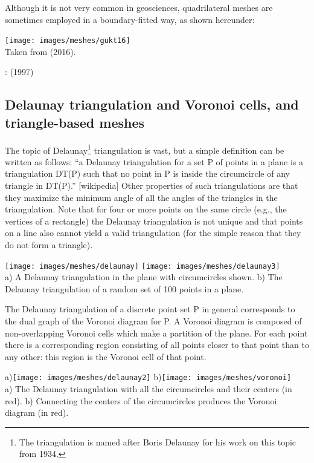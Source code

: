 Although it is not very common in geosciences, quadrilateral meshes are sometimes 
employed in a boundary-fitted way, as shown hereunder:

\begin{center}
\texttt{[image: images/meshes/gukt16]}\\
{\captionfont Taken from \textcite{gukt16} (2016).}
\end{center}

\Literature: \textcite{jole97} (1997)

\subsection{Delaunay triangulation and Voronoi cells, and triangle-based meshes} \label{ss:delaunay}

The topic of Delaunay\footnote{The triangulation is named after 
Boris Delaunay for his work on this topic from 1934.}
triangulation is vast, but a simple definition can be written 
as follows:
``a Delaunay triangulation for a set P 
of points in a plane is a triangulation DT(P) such that no point in P is  
inside the circumcircle of any triangle in DT(P).'' [wikipedia]
Other properties of such triangulations are that they 
maximize the minimum angle of all the angles of the 
triangles in the triangulation.
Note that for four or more points on the same circle (e.g., the 
vertices of a rectangle) the Delaunay triangulation is  
not unique and that points on a line also cannot yield a valid triangulation
(for the simple reason that they do not form a triangle).

\begin{center}
\texttt{[image: images/meshes/delaunay]}
\texttt{[image: images/meshes/delaunay3]}\\
{\captionfont a) A Delaunay triangulation in the plane with circumcircles shown.
b) The Delaunay triangulation of a random set of 100 points in a plane.}
\end{center}

The Delaunay triangulation of a discrete point set P in general corresponds 
to the dual graph of the Voronoi diagram for P. 
A Voronoi diagram is composed of non-overlapping Voronoi cells which make a partition 
of the plane. 
For each point there is a corresponding region consisting of all points closer to that 
point than to any other: this region is the Voronoi cell of that point.

\begin{center}
a)\texttt{[image: images/meshes/delaunay2]}
b)\texttt{[image: images/meshes/voronoi]}\\
{\captionfont a) The Delaunay triangulation with all the circumcircles and their centers (in red).
b) Connecting the centers of the circumcircles produces the Voronoi diagram (in red). }
\end{center}

